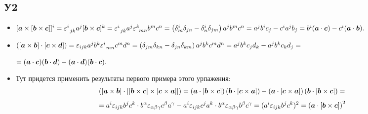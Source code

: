 \subsection*{У2}
\begin{itemize}
	\item $[\mbox{\boldmath $a$} \times [\mbox{\boldmath $b$} \times \mbox{\boldmath $c$}]]^i = \varepsilon_{\phantom{0} j k}^{i} a^j [\mbox{\boldmath $b$} \times \mbox{\boldmath $c$}]^k
	=
	\varepsilon_{\phantom{0} j k}^i a^j \varepsilon_{\phantom{0} m n}^k b^m c^n = \left(\delta_{m}^{i} \delta_{j n} - \delta_{n}^{i} \delta_{j m} \right) a^j b^m c^n
	=
	a^j b^i c_j - c^i a^j b_j
	=
	b^i (\mbox{\boldmath $a$} \cdot \mbox{\boldmath $c$}) - c^i (\mbox{\boldmath $a$} \cdot \mbox{\boldmath $b$}).$

	\item $\left([\mbox{\boldmath $a$} \times \mbox{\boldmath $b$}] \cdot [\mbox{\boldmath $c$} \times \mbox{\boldmath $d$}]\right)
	=
	\varepsilon_{i j k} a^j b^k \varepsilon_{\phantom{0} m n}^{i} c^m d^n
	= \left(\delta_{j m} \delta_{k n} - \delta_{j n} \delta_{k m} \right) a^j b^k c^m d^n
	= a^j b^k c_j d_k - a^j b^k c_k d_j
	=$

	$=(\mbox{\boldmath $a$} \cdot \mbox{\boldmath $c$})(\mbox{\boldmath $b$} \cdot \mbox{\boldmath $d$}) - (\mbox{\boldmath $a$} \cdot \mbox{\boldmath $d$})(\mbox{\boldmath $b$} \cdot \mbox{\boldmath $c$}).$

	\item Тут придется применить результаты первого примера этого урпажения:
	\begin{equation*}
	\left([\mbox{\boldmath $a$} \times \mbox{\boldmath $b$}] \cdot [ [\mbox{\boldmath $b$} \times \mbox{\boldmath $c$}] \times [\mbox{\boldmath $c$} \times \mbox{\boldmath $a$}] ]\right)
	=
	\left(\mbox{\boldmath $a$} \cdot [\mbox{\boldmath $b$} \times \mbox{\boldmath $c$}]\right) \left(\mbox{\boldmath $b$} \cdot [\mbox{\boldmath $c$} \times \mbox{\boldmath $a$}]\right)
	-
	\left(\mbox{\boldmath $a$} \cdot [\mbox{\boldmath $c$} \times \mbox{\boldmath $a$}]\right) \left(\mbox{\boldmath $b$} \cdot [\mbox{\boldmath $b$} \times \mbox{\boldmath $c$}]\right)
	=
\end{equation*}	
\begin{equation*}
	=
	a^i \varepsilon_{i j k} b^j c^k \cdot b^{\alpha} \varepsilon_{\alpha \beta \gamma} c^\beta a^\gamma 
	-
	a^i \varepsilon_{i j k} c^j a^k \cdot b^{\alpha} \varepsilon_{\alpha \beta \gamma} b^\beta c^\gamma
	= (a^i \varepsilon_{i j k} b^j c^k)^2 = \left(\mbox{\boldmath $a$} \cdot [\mbox{\boldmath $b$} \times \mbox{\boldmath $c$}]\right)^2	
\end{equation*}
\end{itemize}


